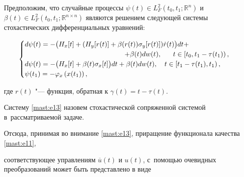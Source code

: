 Предположим, что случайные процессы $ \psi (t)\in L^{2}_{F}(t_{0}, t_{1}; \mathbb  R^{n}) $ и $ \beta (t)\in L^{2}_{F}(t_{0}, t_{1}; \mathbb  R^{n\times n}) $  являются решением следующей системы стохастических дифференциальных уравнений:

 \begin{gather}

\begin{cases}

d\psi(t)=-\bigl( H_{x}[t]+(H_{y}[r(t)]+\beta(r(t))\sigma_{y}[r(t)]) \dot{r}(t)\bigr) dt +

\\ 

\hspace{5.1cm}

+\beta (t) dw(t), \quad~~ t\in \left[ t_{0},t_{1}-\tau (t_{1}) \right) ,  \\

d\psi(t)=-\bigl( H_{x}[t]+\beta(t)\sigma_{x}[t] \bigr) dt+\beta (t) dw(t), \quad t\in \left[ t_{1}-\tau (t_{1}), t_{1} \right), \\

\psi(t_{1})=-\varphi_{x}\left( x(t_{1}) \right) ,

\end{cases}

 \label{mast:e13}

\end{gather}

где $ r(t) $ "---  функция, обратная к $ \gamma (t)=t-\tau (t) $. 



Систему \eqref{mast:e13}  назовем   стохастической сопряженной системой в~рассматриваемой задаче.



Отсюда, принимая во внимание \eqref{mast:e13}, приращение функционала качества \eqref{mast:e11}, 

соответствующее управлениям $ \overline{u}(t) $ и $ u(t) $, с~помощью очевидных преобразований может быть представлено в виде

